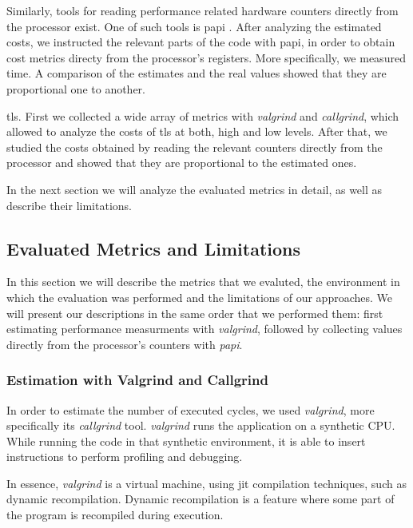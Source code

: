 \documentclass{llncs}
\begin{document}
Similarly, tools for reading performance related hardware counters directly from the processor exist. 
One of such tools is \gls{papi} \cite{dongarra2001using}.
After analyzing the estimated costs, we instructed the relevant parts of the code with \gls{papi}, in order to obtain
cost metrics directy from the processor's registers. More specifically, we measured time. A comparison of the estimates
and the real values showed that they are proportional one to another. 

\gls{tls}. First we collected a wide array of metrics with \textit{valgrind} and \textit{callgrind}, which allowed to
analyze the costs of \gls{tls} at both, high and low levels. After that, we studied the costs obtained by reading
the relevant counters directly from the processor and showed that they are proportional to the estimated ones.

In the next section we will analyze the evaluated metrics in detail, as well as describe their limitations.

\subsection{Evaluated Metrics and Limitations} \label{sec:eval-metrics-and-lims}

In this section we will describe the metrics that we evaluted, the environment in which the evaluation
was performed and the limitations of our approaches. We will present our descriptions in the same order
that we performed them: first estimating performance measurments with \textit{valgrind}, followed
by collecting values directly from the processor's counters with \textit{papi}.

\subsubsection{Estimation with Valgrind and Callgrind}

In order to estimate the number of executed cycles, we used \textit{valgrind}, more specifically
    its \textit{callgrind} tool. \textit{valgrind} runs the application on a synthetic CPU.
While running the code in that synthetic environment, it is able to insert instructions to perform
profiling and debugging.

In essence, \textit{valgrind} is a virtual machine, using \gls{jit}
compilation techniques, such as dynamic recompilation. Dynamic recompilation is a
feature where some part of the program is recompiled during execution.
\end{document}
